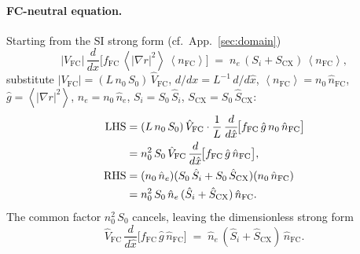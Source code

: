 \documentclass[twocolumn,secnumarabic,amssymb, nobibnotes, aps, prd]{revtex4-2}
\renewcommand{\ne}{n_{e}}  %
\newcommand{\nfc}{n_{\mathrm{FC}}}
\newcommand{\Si}{S_{i}}
\newcommand{\Scx}{S_{\mathrm{CX}}}
\newcommand{\fsa}[1]{\left\langle #1 \right\rangle}
\begin{document}
\paragraph{FC-neutral equation.}
Starting from the SI strong form (cf.\ App.~\ref{sec:domain})
\begin{equation}
  |V_{\mathrm{FC}}|\,\frac{d}{dx}\!\bigl[f_{\mathrm{FC}}\,\fsa{|\nabla r|^{2}}\,\fsa{\nfc}\bigr]
  \;=\;\ne\,(\Si + \Scx)\,\fsa{\nfc},
\end{equation}
substitute $|V_{\mathrm{FC}}| = (L\,n_{0}\,S_{0})\,\hat V_{\mathrm{FC}}$,
$d/dx = L^{-1}\,d/d\hat x$, $\fsa{\nfc} = n_{0}\,\hat n_{\mathrm{FC}}$,
$\hat g = \fsa{|\nabla r|^{2}}$, $\ne = n_{0}\,\hat n_{e}$,
$\Si = S_{0}\,\hat S_{i}$, $\Scx = S_{0}\,\hat S_{\mathrm{CX}}$:
\begin{align}
  \mathrm{LHS}
  &= (L\,n_{0}\,S_{0})\,\hat V_{\mathrm{FC}}
     \cdot\frac{1}{L}\,\frac{d}{d\hat x}\!\bigl[f_{\mathrm{FC}}\,\hat g\,n_{0}\,\hat n_{\mathrm{FC}}\bigr]
   \notag\\
  &= n_{0}^{2}\,S_{0}\,\hat V_{\mathrm{FC}}\,\frac{d}{d\hat x}\!\bigl[f_{\mathrm{FC}}\,\hat g\,\hat n_{\mathrm{FC}}\bigr],\\
  \mathrm{RHS}
  &= (n_{0}\,\hat n_{e})(S_{0}\,\hat S_{i} + S_{0}\,\hat S_{\mathrm{CX}})(n_{0}\,\hat n_{\mathrm{FC}})
   \notag\\
  &= n_{0}^{2}\,S_{0}\,\hat n_{e}\,(\hat S_{i}+\hat S_{\mathrm{CX}})\,\hat n_{\mathrm{FC}}.
\end{align}
The common factor $n_{0}^{2}\,S_{0}$ cancels, leaving the dimensionless
strong form
\begin{equation}
  \hat V_{\mathrm{FC}}\,\frac{d}{d\hat x}\!\bigl[f_{\mathrm{FC}}\,\hat g\,\hat n_{\mathrm{FC}}\bigr]
  \;=\; \hat n_{e}\,(\hat S_{i}+\hat S_{\mathrm{CX}})\,\hat n_{\mathrm{FC}}.
  \label{eq:strong-hat-nFC-A8}
\end{equation}
\end{document}
